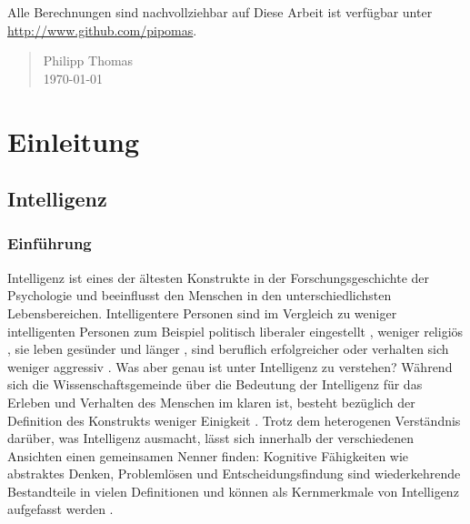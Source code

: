 \documentclass[11pt, twoside, a4paper]{book}		%
\begin{document}
Alle Berechnungen sind nachvollziehbar auf 
Diese Arbeit ist verfügbar unter \url{http://www.github.com/pipomas}.

\vspace{6 mm}

\begin{quote}
Philipp Thomas\\
\today
\end{quote}



\mainmatter
{}		%


\chapter{Einleitung \label{cha:Einleitung}}

\section{Intelligenz \label{sec:intelligenz}}

\subsection{Einführung}

Intelligenz ist eines der ältesten Konstrukte in der Forschungsgeschichte der Psychologie und beeinflusst den Menschen in den unterschiedlichsten Lebensbereichen.
Intelligentere Personen sind im Vergleich zu weniger intelligenten Personen zum Beispiel politisch liberaler eingestellt \citep{Kanazawa2010}, weniger religiös \citep{Zuckerman2013}, sie leben gesünder und länger \citep{Gottfredson2004}, sind beruflich erfolgreicher \citep{Salgado2003} oder verhalten sich weniger aggressiv \citep{Ackerman1997}.
Was aber genau ist unter Intelligenz zu verstehen? Während sich die Wissenschaftsgemeinde über die Bedeutung der Intelligenz für das Erleben und Verhalten des Menschen im klaren ist, besteht bezüglich der Definition des Konstrukts weniger Einigkeit \citep{Neisser1996}. 
Trotz dem heterogenen Verständnis darüber, was Intelligenz ausmacht, lässt sich innerhalb der verschiedenen Ansichten einen gemeinsamen Nenner finden: Kognitive Fähigkeiten wie abstraktes Denken, Problemlösen und Entscheidungsfindung sind wiederkehrende Bestandteile in vielen Definitionen und können als Kernmerkmale von Intelligenz aufgefasst werden \citep{Sternberg1986b}. 
\end{document}

